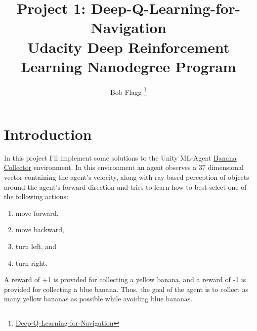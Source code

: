 \documentclass[tog]{acmsiggraph}
\title{
    Project 1: Deep-Q-Learning-for-Navigation\\
    {\large Udacity Deep Reinforcement Learning Nanodegree Program}
}
\author{
    Bob Flagg
    \thanks{
        \href{
            http://github.com/bobflagg/Deep-Q-Learning-for-Navigation}{\underline{Deep-Q-Learning-for-Navigation}}
    }
}
\begin{document}


\maketitle


\keywordlist


\section{Introduction}

In this project I'll implement some solutions to the Unity ML-Agent 
\href{http://github.com/Unity-Technologies/ml-agents/blob/master/docs/Learning-Environment-Examples.md#banana-collector}{\underline{Banana Collector}}
 environment. In this environment an agent observes a 37 dimensional vector containing the agent's velocity, along with ray-based perception of 
objects around the agent's forward direction and tries to learn how to best select one of the following actions:
\begin{enumerate}
	\item move forward,
	\item move backward,
	\item turn left, and
	\item turn right.
\end{enumerate}
A reward of +1 is provided for collecting a yellow banana, and a reward of -1 is provided for collecting a blue banana.
Thus, the goal of the agent is to collect as many yellow bananas as possible while avoiding blue bananas.
\end{document}
